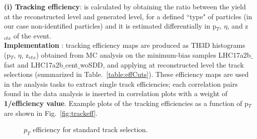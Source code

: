 
{\bf \normalsize (i) Tracking efficiency}: is calculated by obtaining the ratio between the yield at the reconstructed level and generated level, for a defined ``type" of particles (in our case non-identified particles) and it is estimated differentially in p$_T$, $\eta$, and z$_{vtx}$ of the event.\\
{\bf Implementation }: tracking efficiency maps are produced as TH3D histograms (p$_T$, $\eta$, z$_{vtx}$) obtained from MC analysis on the minimum-bias samples LHC17a2b$\_$fast and LHC17a2b$\_$cent$\_$woSDD, and applying at reconstructed level the track selections (summarized in Table.~\ref{table:effCuts}). These efficiency maps are used in the analysis tasks to extract single track efficiencies; each correlation pairs found in the data analysis is inserted in correlation plots with a weight of {\bf 1/efficiency value}. Example plots of the tracking efficiencies as a function of p$_T$ are shown in Fig.~\ref{fig:trackeff}.




\begin{figure}[h]
	\centering
	\caption{$p_T$ efficiency for standard track selection.}
	\label{fig:trackeffvsspecies}	
\end{figure}

